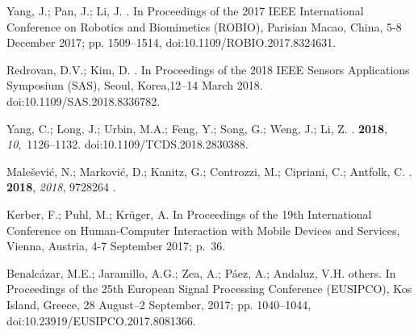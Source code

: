 \documentclass[sensors,review,accept,moreauthors,pdftex]{Definitions/mdpi}
\begin{document}
\begin{thebibliography}{999}
Yang, J.; Pan, J.; Li, J.
. In {Proceedings of the 2017 IEEE International Conference on Robotics and Biomimetics (ROBIO),} Parisian Macao, China, 5-8 December 2017;
\newblock pp. 1509--1514, doi:10.1109/ROBIO.2017.8324631.

Redrovan, D.V.; Kim, D.
. In {Proceedings of the } 2018 IEEE Sensors Applications Symposium (SAS), {Seoul, Korea,12--14 March 2018}. doi:10.1109/SAS.2018.8336782.

Yang, C.; Long, J.; Urbin, M.A.; Feng, Y.; Song, G.; Weng, J.; Li, Z.
.
 {\bf
  2018}, {\em 10},~1126--1132. doi:10.1109/TCDS.2018.2830388.

Male{\v{s}}evi{\'{c}}, N.; Markovi{\'{c}}, D.; Kanitz, G.; Controzzi, M.;
  Cipriani, C.; Antfolk, C.
.
 {\bf 2018}, {\em 2018}, 9728264 .

Kerber, F.; Puhl, M.; Kr{\"{u}}ger, A.
In {Proceedings of the 19th International Conference on Human-Computer Interaction with Mobile Devices and Services,} Vienna, Austria, 4-7 September 2017;
\newblock p.~36.

Benalc{\'a}zar, M.E.; Jaramillo, A.G.; Zea, A.; P{\'a}ez, A.; Andaluz, V.H.
  others.
 In {Proceedings of the 25th European Signal Processing Conference (EUSIPCO),} Kos Island, Greece, 28 August--2 September, 2017;
\newblock pp. 1040--1044, doi:10.23919/EUSIPCO.2017.8081366.


\end{thebibliography}
\end{document}
